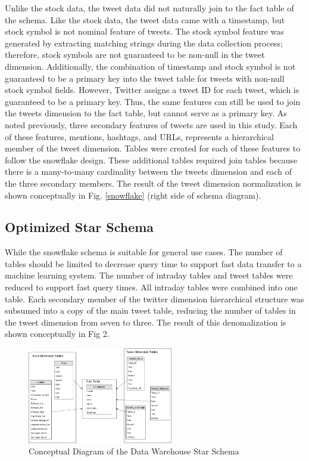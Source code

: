 \documentclass[journal]{IEEEtran}
\begin{document}
Unlike the stock data, the tweet data did not naturally join to the fact
 table of the schema.
Like the stock data, the tweet data came with a timestamp, but stock symbol
 is not nominal feature of tweets.
The stock symbol feature was generated by extracting matching strings
 during the data collection process; therefore, stock symbols are not
 guaranteed to be non-null in the tweet dimension.
Additionally, the combination of timestamp and stock symbol is not guaranteed
 to be a primary key into the tweet table for tweets with non-null stock symbol
 fields.
However, Twitter assigns a tweet ID for each tweet, which is guaranteed to be
 a primary key.
Thus, the same features can still be used to join the tweets dimension to the 
 fact table, but cannot serve as a primary key.
As noted previously, three secondary features of tweets are used in this study.
Each of these features, mentions, hashtags, and URLs, represents a hierarchical
 member of the tweet dimension.
Tables were created for each of these features to follow the snowflake design.
These additional tables required join tables because there is a many-to-many
 cardinality between the tweets dimension and each of the three secondary members.
The result of the tweet dimension normalization is shown conceptually
 in Fig. \ref{snowflake} (right side of schema diagram).

\subsection{Optimized Star Schema}

While the snowflake schema is suitable for general use cases.
The number of tables should be limited to decrease query time to support
 fast data transfer to a machine learning system.
The number of intraday tables and tweet tables were reduced to support
 fast query times.
All intraday tables were combined into one table. 
Each secondary member of the twitter dimension hierarchical structure was
 subsumed into a copy of the main tweet table, reducing the number of tables
 in the tweet dimension from seven to three.
The result of this denomalization is shown conceptually in Fig 2.


\begin{figure}
	\centering
	\includegraphics[width=2.5in]{Star_Conceptual_Schema.png}
	\caption{Conceptual Diagram of the Data Warehouse Star Schema}
	\label{star}
\end{figure}
\end{document}
